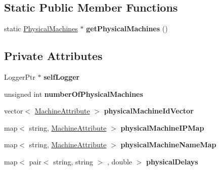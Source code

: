 \subsection*{\-Static \-Public \-Member \-Functions}
\begin{DoxyCompactItemize}
\item 
\hypertarget{classPhysicalMachines_ac7571685926e07854aae3443f65f50a3}{static \hyperlink{classPhysicalMachines}{\-Physical\-Machines} $\ast$ {\bfseries get\-Physical\-Machines} ()}\label{classPhysicalMachines_ac7571685926e07854aae3443f65f50a3}

\end{DoxyCompactItemize}
\subsection*{\-Private \-Attributes}
\begin{DoxyCompactItemize}
\item 
\hypertarget{classPhysicalMachines_a7e2eb49b7471942f32957d98dfb1bdfc}{\-Logger\-Ptr $\ast$ {\bfseries self\-Logger}}\label{classPhysicalMachines_a7e2eb49b7471942f32957d98dfb1bdfc}

\item 
\hypertarget{classPhysicalMachines_a4dc743f0f49e836614f111169bf72469}{unsigned int {\bfseries number\-Of\-Physical\-Machines}}\label{classPhysicalMachines_a4dc743f0f49e836614f111169bf72469}

\item 
\hypertarget{classPhysicalMachines_ab572dbd640726f0a26e1b015e4ada06b}{vector$<$ \hyperlink{structPhysicalMachines_1_1MachineAttribute}{\-Machine\-Attribute} $>$ {\bfseries physical\-Machine\-Id\-Vector}}\label{classPhysicalMachines_ab572dbd640726f0a26e1b015e4ada06b}

\item 
\hypertarget{classPhysicalMachines_a7254a93c7facb45061dc292011c9d5bf}{map$<$ string, \hyperlink{structPhysicalMachines_1_1MachineAttribute}{\-Machine\-Attribute} $>$ {\bfseries physical\-Machine\-I\-P\-Map}}\label{classPhysicalMachines_a7254a93c7facb45061dc292011c9d5bf}

\item 
\hypertarget{classPhysicalMachines_a6252cdcbeb70457f1342fb4bcc95d9ab}{map$<$ string, \hyperlink{structPhysicalMachines_1_1MachineAttribute}{\-Machine\-Attribute} $>$ {\bfseries physical\-Machine\-Name\-Map}}\label{classPhysicalMachines_a6252cdcbeb70457f1342fb4bcc95d9ab}

\item 
\hypertarget{classPhysicalMachines_a730cd5a3dbb92247449b571c58f21cc5}{map$<$ pair$<$ string, string $>$\*
, double $>$ {\bfseries physical\-Delays}}\label{classPhysicalMachines_a730cd5a3dbb92247449b571c58f21cc5}

\end{DoxyCompactItemize}
